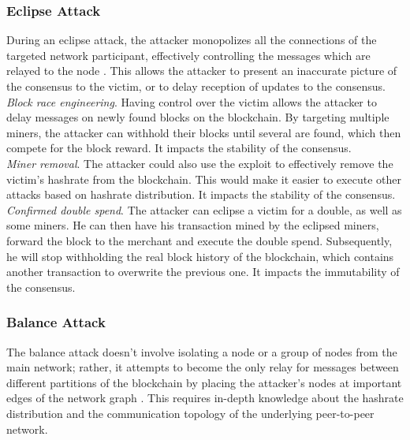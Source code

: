 \documentclass[12pt,a4paper]{article}
\begin{document}
\subsubsection{Eclipse Attack}

During an eclipse attack, the attacker monopolizes all the connections of the targeted network participant, effectively controlling the messages which are relayed to the \gls{node} \cite{eclipse}. This allows the attacker to present an inaccurate picture of the \gls{consensus} to the victim, or to delay reception of updates to the \gls{consensus}.\\

\textit{Block race engineering}. Having control over the victim allows the attacker to delay messages on newly found \glspl{block} on the \gls{blockchain}. By targeting multiple \glspl{miner}, the attacker can withhold their blocks until several are found, which then compete for the block reward. It impacts the stability of the \gls{consensus}.\\

\textit{Miner removal}. The attacker could also use the exploit to effectively remove the victim's \gls{hashrate} from the \gls{blockchain}. This would make it easier to execute other attacks based on hashrate distribution. It impacts the stability of the \gls{consensus}.\\

\textit{Confirmed double spend}. The attacker can eclipse a victim for a \gls{double}, as well as some \glspl{miner}. He can then have his transaction mined by the eclipsed miners, forward the block to the merchant and execute the double spend. Subsequently, he will stop withholding the real block history of the \gls{blockchain}, which contains another transaction to overwrite the previous one. It impacts the immutability of the \gls{consensus}.\\

\subsubsection{Balance Attack}

The balance attack doesn't involve isolating a node or a group of nodes from the main network; rather, it attempts to become the only relay for messages between different partitions of the \gls{blockchain} by placing the attacker's nodes at important edges of the network graph \cite{balance}. This requires in-depth knowledge about the \gls{hashrate} distribution and the communication topology of the underlying peer-to-peer network.\\
\end{document}
